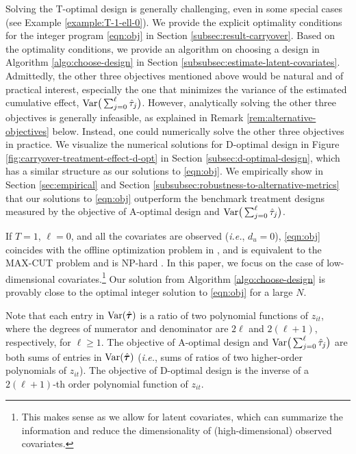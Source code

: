 	Solving the T-optimal design is generally challenging, even in some special cases (see Example \ref{example:T-1-ell-0}).
	We provide the explicit optimality conditions for the integer program \eqref{eqn:obj} in Section \ref{subsec:result-carryover}. Based on the optimality conditions, we provide an algorithm on choosing a design in Algorithm \ref{algo:choose-design} in Section \ref{subsubsec:estimate-latent-covariates}. 
	Admittedly, the other three objectives mentioned above would be natural and of practical interest, especially the one that minimizes the variance of the estimated cumulative effect, $\mathrm{Var}\big(\sum_{j = 0}^\ell \hat{\tau}_j\big)$. However, analytically solving the other three objectives is generally infeasible, as explained in Remark \ref{rem:alternative-objectives} below. Instead, one could numerically solve the other three objectives in practice. We visualize the numerical solutions for D-optimal design in Figure \ref{fig:carryover-treatment-effect-d-opt} in Section \ref{subsec:d-optimal-design}, which has a similar structure as our solutions to \eqref{eqn:obj}. We empirically show in Section \ref{sec:empirical} and Section \ref{subsubsec:robustness-to-alternative-metrics} that our solutions to \eqref{eqn:obj} outperform the benchmark treatment designs measured by the objective of A-optimal design and $\mathrm{Var}\big(\sum_{j = 0}^\ell \hat{\tau}_j\big)$.
	

	

	\begin{example}\label{example:T-1-ell-0}
	    If $T=1$, $\ell = 0$, and all the covariates are observed ({\it i.e.}, $d_u = 0$),  \eqref{eqn:obj} coincides with the offline optimization problem in \cite{bhat2019near}, and is equivalent to the MAX-CUT problem and is NP-hard \citep{hayes2002computing,mertens2006easiest}. In this paper, we focus on the case of low-dimensional covariates.\footnote{This makes sense as we allow for latent covariates, which can summarize the information and reduce the dimensionality of (high-dimensional) observed covariates.} Our solution from Algorithm \ref{algo:choose-design} is provably close to the optimal integer solution to \eqref{eqn:obj} for a large $N$. 
	\end{example}
	


    \begin{remark}\label{rem:alternative-objectives}
    Note that each entry in $\mathrm{Var}(\hat{\bm{\tau}}) $ is a ratio of two polynomial functions of $z_{it}$, where the degrees of numerator and denominator are $2\ell$ and $2(\ell+1)$, respectively, for $\ell \geq 1$. The objective of A-optimal design and $\mathrm{Var}\big(\sum_{j = 0}^\ell \hat{\tau}_j\big)$ are both sums of entries in $\mathrm{Var}(\hat{\bm{\tau}}) $ ({\it i.e.}, sums of ratios of two higher-order polynomials of $z_{it}$). The objective of D-optimal design is the inverse of a $2(\ell+1)$-th order polynomial function of $z_{it}$. 
 	\end{remark}
 	
